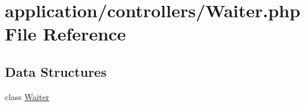 \hypertarget{_waiter_8php}{}\section{application/controllers/\+Waiter.php File Reference}
\label{_waiter_8php}
\subsection*{Data Structures}
\begin{DoxyCompactItemize}
\item 
class \mbox{\hyperlink{class_waiter}{Waiter}}
\end{DoxyCompactItemize}
